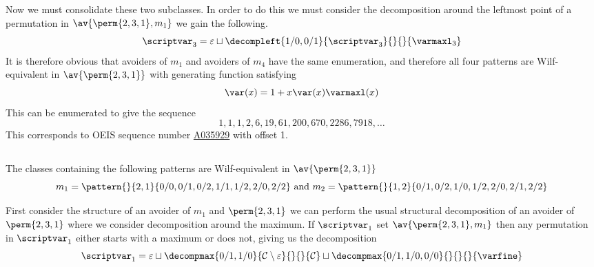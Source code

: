 Now we must consolidate these two subclasses. In order to do this we must
consider the decomposition around the leftmost point of a permutation in
\(\av{\perm{2,3,1},m_1}\) we gain the following.
\begin{equation*}
    \scriptvar_3 = \varepsilon \sqcup
    \decompleft{1/0,0/1}{\scriptvar_3}{}{}{\mathcal{\varmaxl}_3}
\end{equation*}
It is therefore obvious that avoiders of \(m_1\) and avoiders of \(m_4\)
have the same enumeration, and therefore all four patterns are Wilf-equivalent
in \(\av{\perm{2,3,1}}\) with generating function satisfying
\begin{equation*}
    \var(x) = 1 + x\var(x)\varmaxl(x)
\end{equation*}
This can be enumerated to give the sequence
\begin{equation*}
    1, 1, 1, 2, 6, 19, 61, 200, 670, 2286, 7918,\dotsc
\end{equation*}
This corresponds to OEIS sequence number \href{https://oeis.org/A035929}{A035929}
with offset 1.

\subsection{}
\nextvar
The classes containing the following patterns are Wilf-equivalent
in \(\av{\perm{2,3,1}}\)
\begin{equation*}
    m_1 = \pattern{}{2,1}{0/0,0/1,0/2,
                    1/1,1/2,
                    2/0,2/2}
    \text{ and }
    m_2 = \pattern{}{1,2}{0/1,0/2,
                    1/0,1/2,
                    2/0,2/1,2/2}
\end{equation*}

First consider the structure of an avoider of \(m_1\) and \(\perm{2,3,1}\)
we can perform the usual structural decomposition of an avoider
of \(\perm{2,3,1}\) where we consider decomposition around the maximum.
If \(\scriptvar_1\) set \(\av{\perm{2,3,1},m_1}\) then any permutation in
\(\scriptvar_1\) either starts with a maximum or does not, giving us the
decomposition
\begin{equation*}
    \scriptvar_1 = \varepsilon \sqcup
    \decompmax{0/1,1/0}{\mathcal{C}\setminus\varepsilon}{}{}{\mathcal{C}} \sqcup
    \decompmax{0/1,1/0,0/0}{}{}{}{\mathcal{\varfine}}
\end{equation*}

